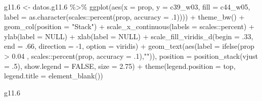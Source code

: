 \documentclass[
  12pt,
]{book}
\newenvironment{Shaded}{\begin{snugshade}}{\end{snugshade}}
\newcommand{\AttributeTok}[1]{\textcolor[rgb]{0.77,0.63,0.00}{#1}}
\newcommand{\ConstantTok}[1]{\textcolor[rgb]{0.00,0.00,0.00}{#1}}
\newcommand{\DecValTok}[1]{\textcolor[rgb]{0.00,0.00,0.81}{#1}}
\newcommand{\FloatTok}[1]{\textcolor[rgb]{0.00,0.00,0.81}{#1}}
\newcommand{\FunctionTok}[1]{\textcolor[rgb]{0.00,0.00,0.00}{#1}}
\newcommand{\NormalTok}[1]{#1}
\newcommand{\OtherTok}[1]{\textcolor[rgb]{0.56,0.35,0.01}{#1}}
\newcommand{\SpecialCharTok}[1]{\textcolor[rgb]{0.00,0.00,0.00}{#1}}
\newcommand{\StringTok}[1]{\textcolor[rgb]{0.31,0.60,0.02}{#1}}
\begin{document}
\begin{Shaded}
\begin{Highlighting}[]
\NormalTok{g11}\FloatTok{.6} \OtherTok{\textless{}{-}}\NormalTok{ datos.g11}\FloatTok{.6} \SpecialCharTok{\%\textgreater{}\%} 
  \FunctionTok{ggplot}\NormalTok{(}\FunctionTok{aes}\NormalTok{(}\AttributeTok{x =}\NormalTok{ prop, }\AttributeTok{y =}\NormalTok{ c39\_w03, }\AttributeTok{fill =}\NormalTok{ c44\_w05, }
             \AttributeTok{label =} \FunctionTok{as.character}\NormalTok{(scales}\SpecialCharTok{::}\FunctionTok{percent}\NormalTok{(prop, }\AttributeTok{accuracy =}\NormalTok{ .}\DecValTok{1}\NormalTok{)))) }\SpecialCharTok{+} 
  \FunctionTok{theme\_bw}\NormalTok{() }\SpecialCharTok{+} 
  \FunctionTok{geom\_col}\NormalTok{(}\AttributeTok{position =} \StringTok{"Stack"}\NormalTok{) }\SpecialCharTok{+}
  \FunctionTok{scale\_x\_continuous}\NormalTok{(}\AttributeTok{labels =}\NormalTok{ scales}\SpecialCharTok{::}\NormalTok{percent) }\SpecialCharTok{+}
  \FunctionTok{ylab}\NormalTok{(}\AttributeTok{label =} \ConstantTok{NULL}\NormalTok{) }\SpecialCharTok{+}
  \FunctionTok{xlab}\NormalTok{(}\AttributeTok{label =} \ConstantTok{NULL}\NormalTok{) }\SpecialCharTok{+}
  \FunctionTok{scale\_fill\_viridis\_d}\NormalTok{(}\AttributeTok{begin =}\NormalTok{ .}\DecValTok{33}\NormalTok{, }\AttributeTok{end =}\NormalTok{ .}\DecValTok{66}\NormalTok{, }\AttributeTok{direction =} \SpecialCharTok{{-}}\DecValTok{1}\NormalTok{, }\AttributeTok{option =} \StringTok{\textquotesingle{}viridis\textquotesingle{}}\NormalTok{) }\SpecialCharTok{+}
  \FunctionTok{geom\_text}\NormalTok{(}\FunctionTok{aes}\NormalTok{(}\AttributeTok{label =} \FunctionTok{ifelse}\NormalTok{(prop }\SpecialCharTok{\textgreater{}} \FloatTok{0.04}\NormalTok{ , scales}\SpecialCharTok{::}\FunctionTok{percent}\NormalTok{(prop, }\AttributeTok{accuracy =}\NormalTok{ .}\DecValTok{1}\NormalTok{),}\StringTok{""}\NormalTok{)),}
            \AttributeTok{position =} \FunctionTok{position\_stack}\NormalTok{(}\AttributeTok{vjust =}\NormalTok{ .}\DecValTok{5}\NormalTok{),}
            \AttributeTok{show.legend =} \ConstantTok{FALSE}\NormalTok{,}
            \AttributeTok{size =} \FloatTok{2.75}\NormalTok{) }\SpecialCharTok{+} 
  \FunctionTok{theme}\NormalTok{(}\AttributeTok{legend.position =} \StringTok{\textquotesingle{}top\textquotesingle{}}\NormalTok{,}
        \AttributeTok{legend.title =} \FunctionTok{element\_blank}\NormalTok{()) }

\NormalTok{g11}\FloatTok{.6}
\end{Highlighting}
\end{Shaded}
\end{document}
